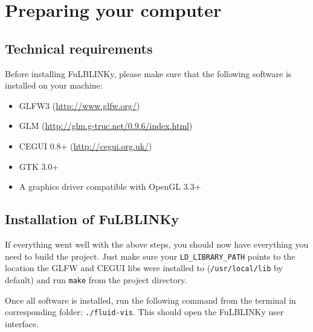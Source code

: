 \documentclass[
12pt, %
a4paper, %
oneside, %
headinclude,footinclude, %
BCOR5mm, %
]{scrartcl}
\begin{document}

\newpage %


\section{Preparing your computer}
\subsection{Technical requirements}
Before installing FuLBLINKy, please make sure that the following software is installed on your machine:
\begin{itemize}
\item GLFW3 (\url{http://www.glfw.org/})
\item GLM (\url{http://glm.g-truc.net/0.9.6/index.html})
\item CEGUI 0.8+ (\url{http://cegui.org.uk/})
\item GTK 3.0+
\item A graphics driver compatible with OpenGL 3.3+
\end{itemize}


\subsection{Installation of FuLBLINKy}
If everything went well with the above steps, you should now have everything you need to build the project. Just make sure your \texttt{LD\_LIBRARY\_PATH} points to the location the GLFW and CEGUI libs were installed to (\texttt{/usr/local/lib} by default) and run \texttt{make} from the project directory. 

Once all software is installed, run the following command from the terminal in corresponding folder: \texttt{./fluid-vis}. This should open the FuLBLINKy user interface.

\end{document}
